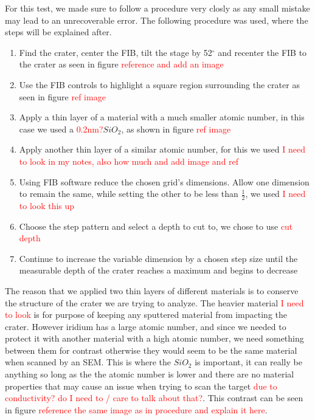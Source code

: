 \documentclass[review]{elsarticle}
\begin{document}
			For this test, we made sure to follow a procedure very closly as any small mistake may lead to an unrecoverable error. The following procedure was used, where the steps will be
			explained after.
			\begin{enumerate}
				\item {Find the crater, center the FIB, tilt the stage by 52$^{\circ}$ and recenter the FIB to the crater as seen in figure \textcolor{red}{reference and add an image}}
				\item {Use the FIB controls to highlight a square region surrounding the crater as seen in figure \textcolor{red}{ref image}}
				\item {Apply a thin layer of a material with a much smaller atomic number, in this case we used a \textcolor{red}{0.2nm?}$SiO_2$, as shown in figure \textcolor{red}{ref image}}
				\item {Apply another thin layer of a similar atomic number, for this we used \textcolor{red}{I need to look in my notes, also how much and add image and ref}}
				\item {Using FIB software reduce the chosen grid's dimensions. Allow one dimension to remain the same, while setting the other to be less than $\frac{1}{2}$, we used 
						\textcolor{red}{I need to look this up}}
				\item {Choose the step pattern and select a depth to cut to, we chose to use \textcolor{red}{cut depth}}
				\item {Continue to increase the variable dimension by a chosen step size until the measurable depth of the crater reaches a maximum and begins to decrease}
			\end{enumerate}
			
			The reason that we applied two thin layers of different materials is to conserve the structure of the crater we are trying to analyze. The heavier material 
			\textcolor{red}{I need to look} is for purpose of keeping any sputtered material from impacting the crater. However iridium has a large atomic number, and since 
			we needed to protect it with another material with a high atomic number, we need something between them for contrast otherwise they would seem to be the same material 
			when scanned by an SEM. This is where the $SiO_2$ is important, it can really be anything so long as the the atomic number is lower and there are no material properties that
			may cause an issue when trying to scan the target \textcolor{red}{due to conductivity? do I need to / care to talk about that?}. This contrast can be seen in figure 
			\textcolor{red}{reference the same image as in procedure and explain it here}. 
\end{document}

